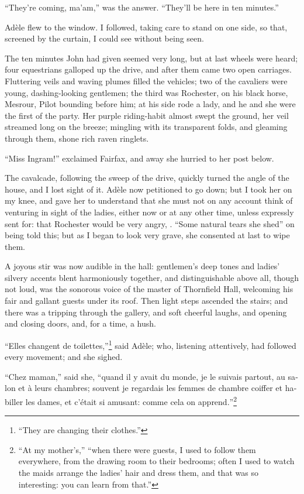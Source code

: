 \enquote{They're coming, ma'am,} was the answer. \enquote{They'll be
here in ten minutes.}

Adèle flew to the window. I followed, taking care to stand on one side,
so that, screened by the curtain, I could see without being seen.

The ten minutes John had given seemed very long, but at last wheels were
heard; four equestrians galloped up the drive, and after them came two
open carriages. Fluttering veils and waving plumes filled the vehicles;
two of the cavaliers were young, dashing-looking gentlemen; the third
was \Mr{} Rochester, on his black horse, Mesrour, Pilot bounding before
him; at his side rode a lady, and he and she were the first of the
party. Her purple riding-habit almost swept the ground, her veil
streamed long on the breeze; mingling with its transparent folds, and
gleaming through them, shone rich raven ringlets.

\enquote{Miss Ingram!} exclaimed \Mrs{} Fairfax, and away she hurried to
her post below.

The cavalcade, following the sweep of the drive, quickly turned the
angle of the house, and I lost sight of it. Adèle now petitioned to go
down; but I took her on my knee, and gave her to understand that she
must not on any account think of venturing in sight of the ladies,
either now or at any other time, unless expressly sent for: that \Mr{}
 Rochester would be very angry, \etc. \enquote{Some natural tears she
shed} on being told this; but as I began to look very grave, she
consented at last to wipe them.

A joyous stir was now audible in the hall: gentlemen's deep tones and
ladies' silvery accents blent harmoniously together, and distinguishable
above all, though not loud, was the sonorous voice of the master of
Thornfield Hall, welcoming his fair and gallant guests under its roof. 
Then light steps ascended the stairs; and there was a tripping through
the gallery, and soft cheerful laughs, and opening and closing doors,
and, for a time, a hush.

\foreignquote{french}{Elles changent de toilettes,}\footnote{\enquote{They are changing their clothes.}} 
said Adèle; who, listening attentively, had followed every movement; and she sighed.

\foreignquote{french}{Chez maman,} said she, \foreignquote{french}{quand il y avait du monde, je
le suivais partout, au salon et à leurs chambres; souvent je regardais
les femmes de chambre coiffer et habiller les dames, et c'était si
amusant: comme cela on apprend.}\footnote{\enquote{At my mother's,} \textelp{}
\enquote{when there were guests, I used to follow them everywhere, from the
drawing room to their bedrooms; often I used to watch the maids arrange
the ladies' hair and dress them, and that was so interesting: you can
learn from that.}}

